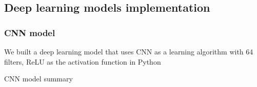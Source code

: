 




\subsection{Deep learning models implementation}




\subsubsection{CNN model}
We built a deep learning model that uses CNN as a learning algorithm with 64 filters, ReLU as the activation function in Python


CNN model summary


